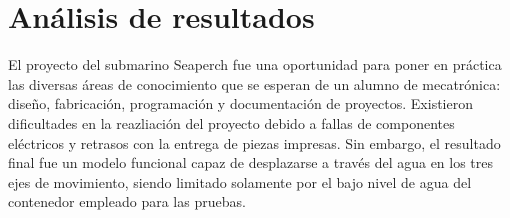 \pagebreak
\section{An\'alisis de resultados}
El proyecto del submarino Seaperch fue una oportunidad para poner en pr\'actica las diversas \'areas de conocimiento que
se esperan de un alumno de mecatr\'onica: dise\~no, fabricaci\'on, programaci\'on y documentaci\'on de proyectos.
Existieron dificultades en la reazliaci\'on del proyecto debido a fallas de componentes el\'ectricos y retrasos con la
entrega de piezas impresas. Sin embargo, el resultado final fue un modelo funcional capaz de desplazarse a trav\'es del agua
en los tres ejes de movimiento, siendo limitado solamente por el bajo nivel de agua del contenedor empleado para las pruebas.


